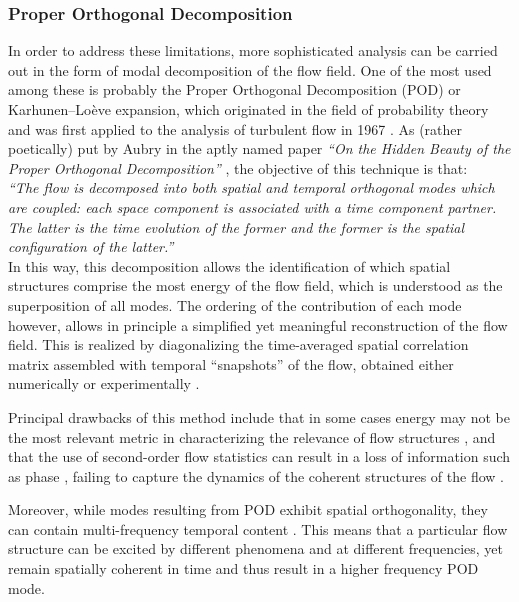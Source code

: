 \subsubsection{Proper Orthogonal Decomposition}

In order to address these limitations, more sophisticated analysis can be carried out in the form of modal decomposition of the flow field. One of the most used among these is probably the Proper Orthogonal Decomposition (POD) or Karhunen--Loève expansion, which originated in the field of probability theory and was first applied to the analysis of turbulent flow in 1967 \cite{lumley1967structure} . As (rather poetically) put by Aubry in the aptly named paper \emph{``On the Hidden Beauty of the Proper Orthogonal Decomposition''} \cite{aubry1991hidden}, the objective of this technique is that:\\

\emph{``The flow is decomposed into both spatial and temporal orthogonal modes which are coupled: each space component is associated with a time component partner. The latter is the time evolution of the former and the former is the spatial configuration of the latter.''}\\

In this way, this decomposition allows the identification of which spatial structures comprise the most energy of the flow field, which is understood as the superposition of all modes. The ordering of the contribution of each mode however, allows in principle a simplified yet meaningful reconstruction of the flow field. This is realized by diagonalizing the time-averaged spatial correlation matrix assembled with temporal ``snapshots'' of the flow, obtained either numerically or experimentally \cite{schmid2010dynamic,bagheri2013koopman}.

Principal drawbacks of this method include that in some cases energy may not be the most relevant metric in characterizing the relevance of flow structures \cite{schmid2010dynamic}, and that the use of second-order flow statistics can result in a loss of information such as phase \cite{aubry1991hidden}, failing to capture the dynamics of the coherent structures of the flow \cite{schmid2011applications}.

Moreover, while modes resulting from POD exhibit spatial orthogonality, they can contain multi-frequency temporal content \cite{jovanovic2014sparsity,sakowitz2014flow}. This means that a particular flow structure can be excited by different phenomena and at different frequencies, yet remain spatially coherent in time and thus result in a higher frequency POD mode. 

